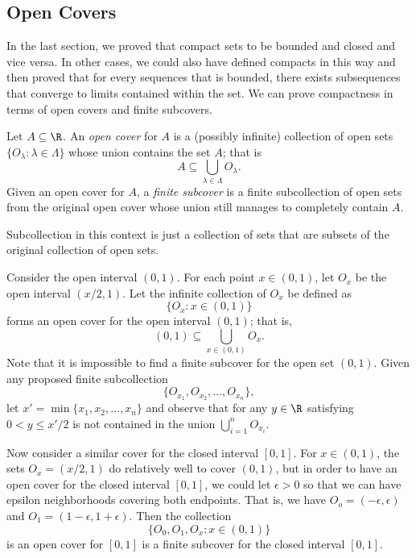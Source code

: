\subsection{Open Covers}
In the last section, we proved that compact sets to be bounded and closed and vice versa. In other cases, we could also have defined compacts in this way and then proved that for every sequences that is bounded, there exists subsequences that converge to limits contained within the set. We can prove compactness in terms of open covers and finite subcovers. 

\begin{tcolorbox}
\begin{defn}
    Let \( A \subseteq \R \). An \textit{open cover} for \( A \) is a (possibly infinite) collection of open sets \( \{ O_{\lambda} : \lambda \in \Lambda \}  \) whose union contains the set \( A \); that is 
    \[ A \subseteq \bigcup_{ \lambda \in \Lambda } O_{\lambda}.  \]
    Given an open cover for \( A \), a \textit{finite subcover} is a finite subcollection of open sets from the original open cover whose union still manages to completely contain \( A \).
\end{defn}
\end{tcolorbox}

Subcollection in this context is just a collection of sets that are subsets of the original collection of open sets.

\begin{ex}
Consider the open interval \( (0,1) \). For each point \( x \in (0,1) \), let \( O_x \) be the open interval \( (x/2, 1) \). Let the infinite collection of \( O_x \) be defined as 
\[ \{ O_{x} : x \in (0,1) \}  \]
forms an open cover for the open interval \( (0,1) \); that is, 
\[  (0,1) \subseteq \bigcup_{ x \in (0,1) } O_x.  \]
Note that it is impossible to find a finite subcover for the open set \( (0,1) \). Given any proposed finite subcollection 
\[ \{ O_{x_1}, O_{x_2}, ..., O_{x_n} \}, \]
let \( x' = \min \{ x_1, x_2, \dots, x_n \}  \) and observe that for any \( y \in \R  \) satisfying \( 0 < y \leq x' /2  \) is not contained in the union \( \bigcup_{ i=1 }^{ n } O_{x_i} \). 
\end{ex}

Now consider a similar cover for the closed interval \( [0,1] \). For \( x \in (0,1) \), the sets \( O_x = (x/2, 1) \) do relatively well to cover \( (0,1) \), but in order to have an open cover for the closed interval \( [0,1] \), we could let \( \epsilon > 0   \) so that we can have epsilon neighborhoods covering both endpoints. That is, we have \( O_o = (-\epsilon , \epsilon ) \) and \( O_1 = (1 - \epsilon, 1 + \epsilon ) \). Then the collection 
\[ \{ O_0, O_1, O_x : x \in (0,1) \}  \]
is an open cover for \( [0,1] \) is a finite subcover for the closed interval \( [0,1] \).

